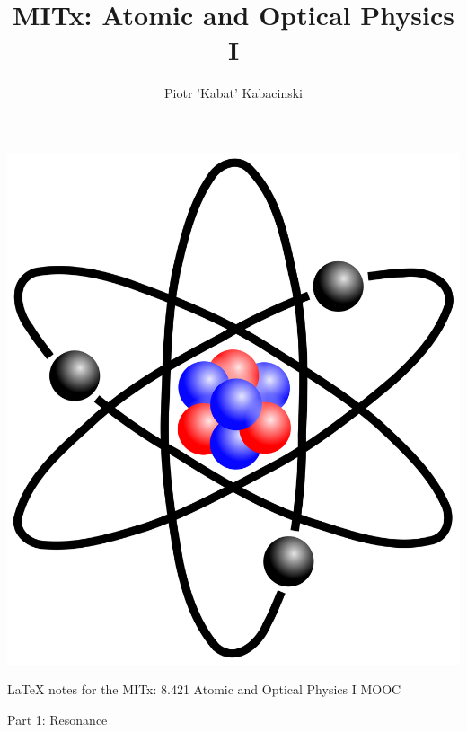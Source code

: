 
\title{\Huge MITx: Atomic and Optical Physics I}
\author{Piotr 'Kabat' Kabacinski}
\date{}



\maketitle

\includegraphics[width=\linewidth]{title}

\begin{center}\LaTeX \hspace{0.5 mm} notes for the MITx: 8.421 Atomic and Optical Physics I MOOC\end{center}

\newpage

\begin{center}\Huge Part 1: Resonance\end{center}



\newpage



\newpage



\newpage

